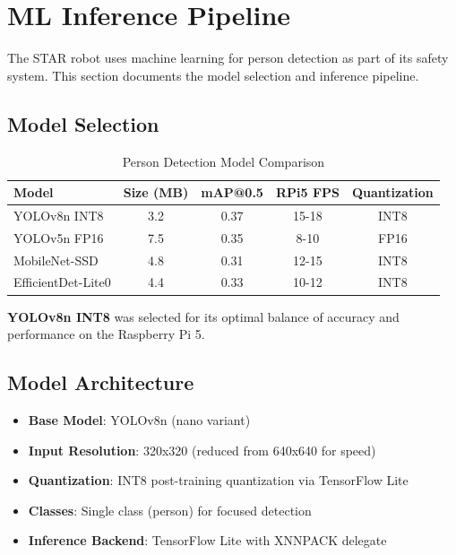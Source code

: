 \section{ML Inference Pipeline}

The STAR robot uses machine learning for person detection as part of its safety system. This section documents the model selection and inference pipeline.

\subsection{Model Selection}

\begin{table}[H]
\centering
\caption{Person Detection Model Comparison}
\begin{tabular}{|l|c|c|c|c|}
\hline
\textbf{Model} & \textbf{Size (MB)} & \textbf{mAP@0.5} & \textbf{RPi5 FPS} & \textbf{Quantization} \\
\hline
YOLOv8n INT8 & 3.2 & 0.37 & 15-18 & INT8 \\
\hline
YOLOv5n FP16 & 7.5 & 0.35 & 8-10 & FP16 \\
\hline
MobileNet-SSD & 4.8 & 0.31 & 12-15 & INT8 \\
\hline
EfficientDet-Lite0 & 4.4 & 0.33 & 10-12 & INT8 \\
\hline
\end{tabular}
\end{table}

\textbf{YOLOv8n INT8} was selected for its optimal balance of accuracy and performance on the Raspberry Pi 5.

\subsection{Model Architecture}

\begin{itemize}
    \item \textbf{Base Model}: YOLOv8n (nano variant)
    \item \textbf{Input Resolution}: 320x320 (reduced from 640x640 for speed)
    \item \textbf{Quantization}: INT8 post-training quantization via TensorFlow Lite
    \item \textbf{Classes}: Single class (person) for focused detection
    \item \textbf{Inference Backend}: TensorFlow Lite with XNNPACK delegate
\end{itemize}

